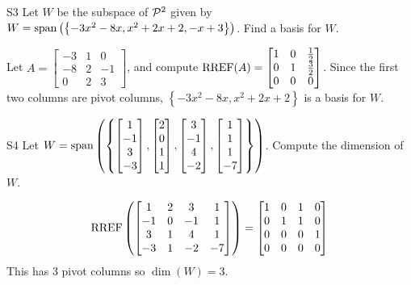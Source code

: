 \documentclass{sbgLAsemi}
\begin{document}
\begin{problem}{S3}
Let $W$ be the subspace of $\P^2$ given by $W = {\rm span} \left( \left\{  -3x^2-8x, x^2+2x+2, -x+3\right\} \right)$.   Find a basis for $W$.
\end{problem}
\begin{solution}
Let $A= \begin{bmatrix}-3 & 1 & 0 \\ -8 & 2 & -1 \\ 0 & 2 & 3\end{bmatrix}$, and compute $\RREF(A) = \begin{bmatrix} 1 & 0 & \frac{1}{2} \\ 0 & 1 & \frac{3}{2} \\ 0 & 0 & 0 \end{bmatrix}$.
Since the first two columns are pivot columns, $\left\{ -3x^2-8x, x^2+2x+2\right\} $ is a basis for $W$.
\end{solution}


\begin{problem}{S4}
Let $W={\rm span}\left( \left\{ \begin{bmatrix} 1 \\ -1 \\ 3 \\ -3 \end{bmatrix},\begin{bmatrix} 2 \\ 0 \\ 1 \\ 1 \end{bmatrix}, \begin{bmatrix} 3 \\ -1 \\ 4 \\ -2 \end{bmatrix},  \begin{bmatrix} 1 \\ 1 \\ 1 \\ -7 \end{bmatrix} \right\}\right)$.  Compute the dimension of $W$.
\end{problem}
\begin{solution}
$$ \RREF \left( \begin{bmatrix} 1 & 2 & 3 & 1 \\ -1 & 0 & -1 & 1 \\ 3 & 1 & 4 & 1 \\ -3 & 1 & -2 & -7 \end{bmatrix} \right) =  \begin{bmatrix} 1 & 0 & 1 & 0 \\ 0 & 1 & 1 & 0 \\ 0 & 0 & 0 & 1 \\ 0 & 0 & 0 & 0\end{bmatrix}$$
This has 3 pivot columns so $\dim(W)=3$.
\end{solution}
\end{document}
